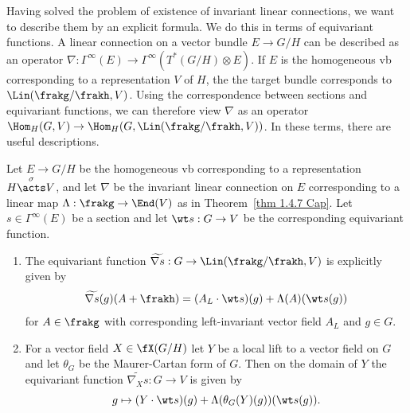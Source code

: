 Having solved the problem of existence of invariant linear connections, we want to describe them by an explicit formula. We do this in terms of equivariant functions. A linear connection on a vector bundle $E\to G\slash H$ can be described as an operator $\nabla:\Gamma^\infty(E)\to \Gamma^\infty(T^\ast(G\slash H)\otimes E)$. If $E$ is the homogeneous \gls{vb} corresponding to a representation $V$ of $H$, the the target bundle corresponds to $\Lin(\frakg\slash\frakh,V)$. Using the correspondence between sections and equivariant functions, we can therefore view $\nabla$ as an operator $\Hom_H(G,V)\to \Hom_H(G,\Lin(\frakg\slash\frakh,V))$. In these terms, there are useful descriptions.

\begin{prop}\label{prop 1.4.7 Cap}
    Let $E\to G\slash H$ be the homogeneous \gls{vb} corresponding to a representation $H\overset{\sigma}{\acts}V$, and let $\nabla$ be the invariant linear connection on $E$ corresponding to a linear map $\Lambda:\frakg\to \End(V)$ as in Theorem~\ref{thm 1.4.7 Cap}. Let $s\in\Gamma^\infty(E)$ be a section and let $\wt s:G\to V$ be the corresponding equivariant function.

    \begin{enumerate}[label=(\arabic*)]
        \item The equivariant function $\widetilde{\nabla s}:G\to \Lin(\frakg\slash\frakh,V)$ is explicitly given by 
        \[\widetilde{\nabla s}(g)(A+\frakh)=(A_L\cdot \wt s)(g)+\Lambda(A)(\wt s(g))\]
        for $A\in\frakg$ with corresponding left-invariant vector field $A_L$ and $g\in G$.
        \item For a vector field $X\in\fX(G\slash H)$ let $Y$ be a local lift to a vector field on $G$ and let $\theta_G$ be the Maurer-Cartan form of $G$. Then on the domain of $Y$ the equivariant function $\widetilde{\nabla_X s}:G\to V$ is given by 
        \[g\mapsto (Y\cdot \wt s)(g)+\Lambda(\theta_G(Y)(g))(\wt s(g)).\]
    \end{enumerate}
\end{prop}
